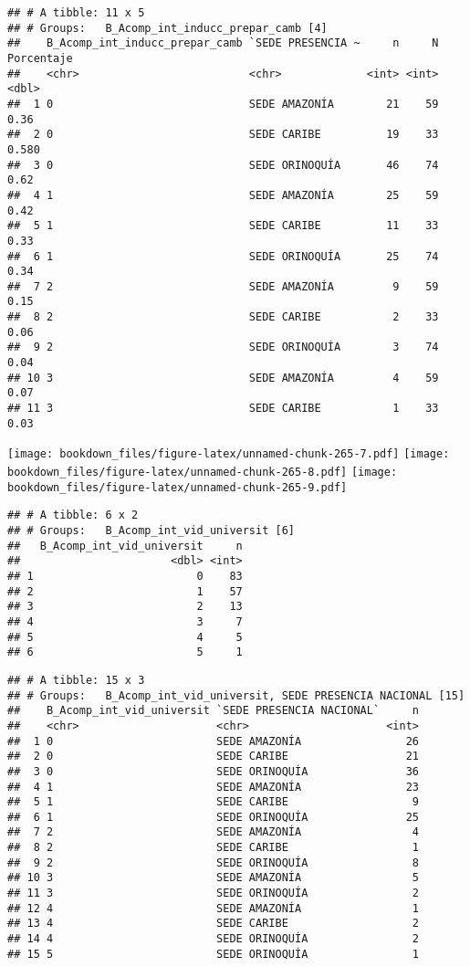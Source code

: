 \documentclass[]{article}
\theoremstyle{definition}
\theoremstyle{definition}
\theoremstyle{definition}
\theoremstyle{remark}
\begin{document}
\begin{verbatim}
## # A tibble: 11 x 5
## # Groups:   B_Acomp_int_inducc_prepar_camb [4]
##    B_Acomp_int_inducc_prepar_camb `SEDE PRESENCIA ~     n     N Porcentaje
##    <chr>                          <chr>             <int> <int>      <dbl>
##  1 0                              SEDE AMAZONÍA        21    59      0.36 
##  2 0                              SEDE CARIBE          19    33      0.580
##  3 0                              SEDE ORINOQUÍA       46    74      0.62 
##  4 1                              SEDE AMAZONÍA        25    59      0.42 
##  5 1                              SEDE CARIBE          11    33      0.33 
##  6 1                              SEDE ORINOQUÍA       25    74      0.34 
##  7 2                              SEDE AMAZONÍA         9    59      0.15 
##  8 2                              SEDE CARIBE           2    33      0.06 
##  9 2                              SEDE ORINOQUÍA        3    74      0.04 
## 10 3                              SEDE AMAZONÍA         4    59      0.07 
## 11 3                              SEDE CARIBE           1    33      0.03
\end{verbatim}

\texttt{[image: bookdown\_files/figure-latex/unnamed-chunk-265-7.pdf]}
\texttt{[image: bookdown\_files/figure-latex/unnamed-chunk-265-8.pdf]}
\texttt{[image: bookdown\_files/figure-latex/unnamed-chunk-265-9.pdf]}

\begin{verbatim}
## # A tibble: 6 x 2
## # Groups:   B_Acomp_int_vid_universit [6]
##   B_Acomp_int_vid_universit     n
##                       <dbl> <int>
## 1                         0    83
## 2                         1    57
## 3                         2    13
## 4                         3     7
## 5                         4     5
## 6                         5     1
\end{verbatim}

\begin{verbatim}
## # A tibble: 15 x 3
## # Groups:   B_Acomp_int_vid_universit, SEDE PRESENCIA NACIONAL [15]
##    B_Acomp_int_vid_universit `SEDE PRESENCIA NACIONAL`     n
##    <chr>                     <chr>                     <int>
##  1 0                         SEDE AMAZONÍA                26
##  2 0                         SEDE CARIBE                  21
##  3 0                         SEDE ORINOQUÍA               36
##  4 1                         SEDE AMAZONÍA                23
##  5 1                         SEDE CARIBE                   9
##  6 1                         SEDE ORINOQUÍA               25
##  7 2                         SEDE AMAZONÍA                 4
##  8 2                         SEDE CARIBE                   1
##  9 2                         SEDE ORINOQUÍA                8
## 10 3                         SEDE AMAZONÍA                 5
## 11 3                         SEDE ORINOQUÍA                2
## 12 4                         SEDE AMAZONÍA                 1
## 13 4                         SEDE CARIBE                   2
## 14 4                         SEDE ORINOQUÍA                2
## 15 5                         SEDE ORINOQUÍA                1
\end{verbatim}
\end{document}
